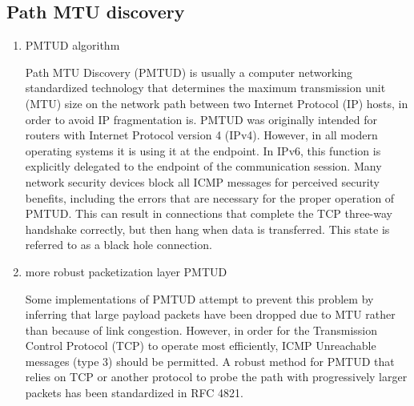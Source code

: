 \documentclass[twocolumn]{preport}
\begin{document}
\subsection{Path MTU discovery}
\begin{enumerate}
 \item PMTUD algorithm\par
   Path MTU Discovery (PMTUD) is usually a computer networking standardized technology that determines the maximum transmission unit (MTU) size on the network path between two Internet Protocol (IP) hosts, in order to avoid IP fragmentation is. PMTUD was originally intended for routers with Internet Protocol version 4 (IPv4). However, in all modern operating systems it is using it at the endpoint. In IPv6, this function is explicitly delegated to the endpoint of the communication session. Many network security devices block all ICMP messages for perceived security benefits, including the errors that are necessary for the proper operation of PMTUD. This can result in connections that complete the TCP three-way handshake correctly, but then hang when data is transferred. This state is referred to as a black hole connection.
 \item more robust packetization layer PMTUD\par
   Some implementations of PMTUD attempt to prevent this problem by inferring that large payload packets have been dropped due to MTU rather than because of link congestion. However, in order for the Transmission Control Protocol (TCP) to operate most efficiently, ICMP Unreachable messages (type 3) should be permitted. A robust method for PMTUD that relies on TCP or another protocol to probe the path with progressively larger packets has been standardized in RFC 4821.
\end{enumerate}





\end{document}

